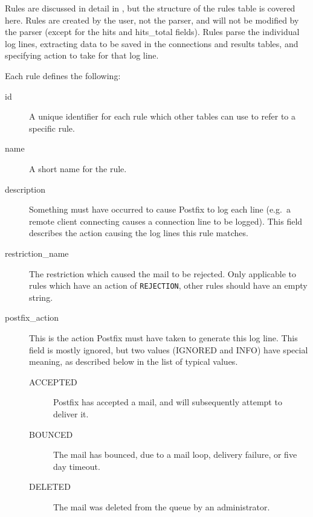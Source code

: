 Rules are discussed in detail in , but the structure of
the rules table is covered here.  Rules are created by the user, not the
parser, and will not be modified by the parser (except for the hits and
hits\_total fields).  Rules parse the individual log lines, extracting data
to be saved in the connections and results tables, and specifying action to
take for that log line.

Each rule defines the following:

\begin{description}

    \item [id] A unique identifier for each rule which other tables can use
        to refer to a specific rule.

    \item [name] A short name for the rule.

    \item [description] Something must have occurred to cause Postfix to
        log each line (e.g.\ a remote client connecting causes a connection
        line to be logged).  This field describes the action causing the
        log lines this rule matches.

    \item [restriction\_name] The restriction which caused the mail to be
        rejected.  Only applicable to rules which have an action of
        \texttt{REJECTION}, other rules should have an empty string.

    \item [postfix\_action] This is the action Postfix must have taken to
        generate this log line.  This field is mostly ignored, but two
        values (IGNORED and INFO) have special meaning, as described below
        in the list of typical values.\label{postfix_action}

        \begin{description}

            \item [ACCEPTED] Postfix has accepted a mail, and will
                subsequently attempt to deliver it.

            \item [BOUNCED] The mail has bounced, due to a mail loop,
                delivery failure, or five day timeout.

            \item [DELETED] The mail was deleted from the queue by an
                administrator.


\end{description}
\end{description}
